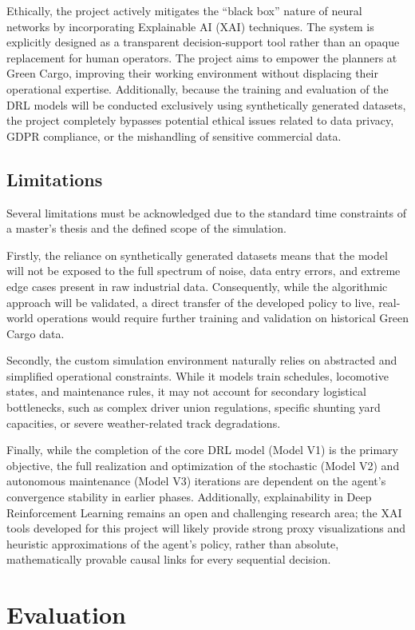 \documentclass[a4paper]{scrartcl}
\begin{document}
Ethically, the project actively mitigates the ``black box'' nature of neural networks by incorporating Explainable AI (XAI) techniques. The system is explicitly designed as a transparent decision-support tool rather than an opaque replacement for human operators. The project aims to empower the planners at Green Cargo, improving their working environment without displacing their operational expertise. Additionally, because the training and evaluation of the DRL models will be conducted exclusively using synthetically generated datasets, the project completely bypasses potential ethical issues related to data privacy, GDPR compliance, or the mishandling of sensitive commercial data.

\subsection{Limitations}
Several limitations must be acknowledged due to the standard time constraints of a master's thesis and the defined scope of the simulation.

Firstly, the reliance on synthetically generated datasets means that the model will not be exposed to the full spectrum of noise, data entry errors, and extreme edge cases present in raw industrial data. Consequently, while the algorithmic approach will be validated, a direct transfer of the developed policy to live, real-world operations would require further training and validation on historical Green Cargo data.

Secondly, the custom simulation environment naturally relies on abstracted and simplified operational constraints. While it models train schedules, locomotive states, and maintenance rules, it may not account for secondary logistical bottlenecks, such as complex driver union regulations, specific shunting yard capacities, or severe weather-related track degradations.

Finally, while the completion of the core DRL model (Model V1) is the primary objective, the full realization and optimization of the stochastic (Model V2) and autonomous maintenance (Model V3) iterations are dependent on the agent's convergence stability in earlier phases. Additionally, explainability in Deep Reinforcement Learning remains an open and challenging research area; the XAI tools developed for this project will likely provide strong proxy visualizations and heuristic approximations of the agent's policy, rather than absolute, mathematically provable causal links for every sequential decision.
\section{Evaluation}
\end{document}
